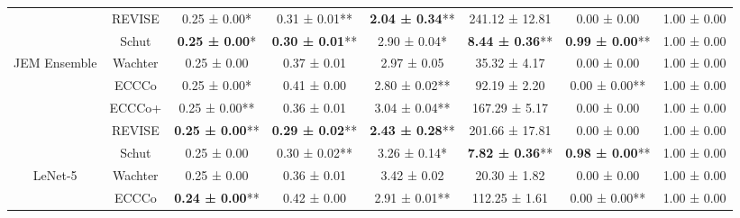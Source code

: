 \begin{table}
{\begin{tabular}[t]{cccccccc}
 & REVISE & 0.25 ± 0.00*\hphantom{*} & 0.31 ± 0.01** & \textbf{2.04 ± 0.34}** & 241.12 ± 12.81\hphantom{*}\hphantom{*} & 0.00 ± 0.00\hphantom{*}\hphantom{*} & 1.00 ± 0.00\hphantom{*}\hphantom{*}\\

 & Schut & \textbf{0.25 ± 0.00}*\hphantom{*} & \textbf{0.30 ± 0.01}** & 2.90 ± 0.04*\hphantom{*} & \textbf{8.44 ± 0.36}** & \textbf{0.99 ± 0.00}** & 1.00 ± 0.00\hphantom{*}\hphantom{*}\\

\multirow[t]{-5}{*}{\centering\arraybackslash JEM Ensemble} & Wachter & 0.25 ± 0.00\hphantom{*}\hphantom{*} & 0.37 ± 0.01\hphantom{*}\hphantom{*} & 2.97 ± 0.05\hphantom{*}\hphantom{*} & 35.32 ± 4.17\hphantom{*}\hphantom{*} & 0.00 ± 0.00\hphantom{*}\hphantom{*} & 1.00 ± 0.00\hphantom{*}\hphantom{*}\\
\cmidrule{1-8}
 & ECCCo & 0.25 ± 0.00*\hphantom{*} & 0.41 ± 0.00\hphantom{*}\hphantom{*} & 2.80 ± 0.02** & 92.19 ± 2.20\hphantom{*}\hphantom{*} & 0.00 ± 0.00** & 1.00 ± 0.00\hphantom{*}\hphantom{*}\\

 & ECCCo+ & 0.25 ± 0.00** & 0.36 ± 0.01\hphantom{*}\hphantom{*} & 3.04 ± 0.04** & 167.29 ± 5.17\hphantom{*}\hphantom{*} & 0.00 ± 0.00\hphantom{*}\hphantom{*} & 1.00 ± 0.00\hphantom{*}\hphantom{*}\\

 & REVISE & \textbf{0.25 ± 0.00}** & \textbf{0.29 ± 0.02}** & \textbf{2.43 ± 0.28}** & 201.66 ± 17.81\hphantom{*}\hphantom{*} & 0.00 ± 0.00\hphantom{*}\hphantom{*} & 1.00 ± 0.00\hphantom{*}\hphantom{*}\\

 & Schut & 0.25 ± 0.00\hphantom{*}\hphantom{*} & 0.30 ± 0.02** & 3.26 ± 0.14*\hphantom{*} & \textbf{7.82 ± 0.36}** & \textbf{0.98 ± 0.00}** & 1.00 ± 0.00\hphantom{*}\hphantom{*}\\

\multirow[t]{-5}{*}{\centering\arraybackslash LeNet-5} & Wachter & 0.25 ± 0.00\hphantom{*}\hphantom{*} & 0.36 ± 0.01\hphantom{*}\hphantom{*} & 3.42 ± 0.02\hphantom{*}\hphantom{*} & 20.30 ± 1.82\hphantom{*}\hphantom{*} & 0.00 ± 0.00\hphantom{*}\hphantom{*} & 1.00 ± 0.00\hphantom{*}\hphantom{*}\\
\cmidrule{1-8}
 & ECCCo & \textbf{0.24 ± 0.00}** & 0.42 ± 0.00\hphantom{*}\hphantom{*} & 2.91 ± 0.01** & 112.25 ± 1.61\hphantom{*}\hphantom{*} & 0.00 ± 0.00** & 1.00 ± 0.00\hphantom{*}\hphantom{*}\\


\end{tabular}}
\end{table}
